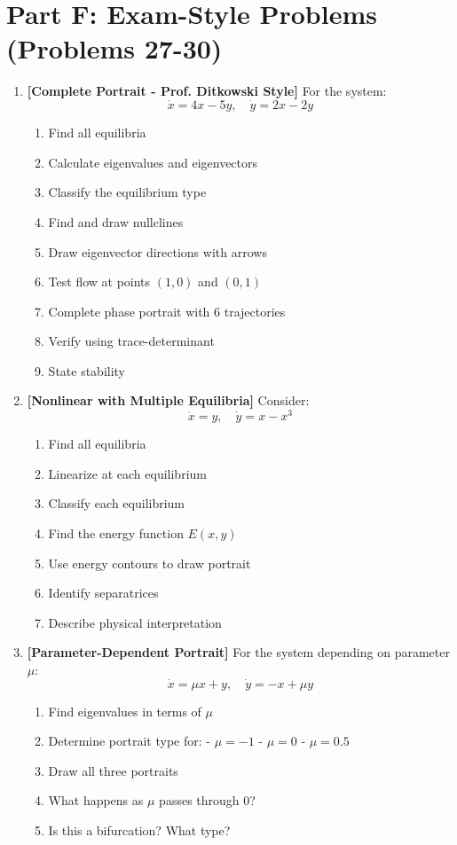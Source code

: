\documentclass[12pt]{article}
\begin{document}
\section*{Part F: Exam-Style Problems (Problems 27-30)}

\begin{enumerate}[resume]
\item \textbf{[Complete Portrait - Prof. Ditkowski Style]}
For the system:
$$\dot{x} = 4x - 5y, \quad \dot{y} = 2x - 2y$$
\begin{enumerate}[label=(\alph*)]
    \item Find all equilibria
    \item Calculate eigenvalues and eigenvectors
    \item Classify the equilibrium type
    \item Find and draw nullclines
    \item Draw eigenvector directions with arrows
    \item Test flow at points $(1,0)$ and $(0,1)$
    \item Complete phase portrait with 6 trajectories
    \item Verify using trace-determinant
    \item State stability
\end{enumerate}

\item \textbf{[Nonlinear with Multiple Equilibria]}
Consider:
$$\dot{x} = y, \quad \dot{y} = x - x^{3}$$
\begin{enumerate}[label=(\alph*)]
    \item Find all equilibria
    \item Linearize at each equilibrium
    \item Classify each equilibrium
    \item Find the energy function $E(x,y)$
    \item Use energy contours to draw portrait
    \item Identify separatrices
    \item Describe physical interpretation
\end{enumerate}

\item \textbf{[Parameter-Dependent Portrait]}
For the system depending on parameter $\mu$:
$$\dot{x} = \mu x + y, \quad \dot{y} = -x + \mu y$$
\begin{enumerate}[label=(\alph*)]
    \item Find eigenvalues in terms of $\mu$
    \item Determine portrait type for:
        - $\mu = -1$
        - $\mu = 0$
        - $\mu = 0.5$
    \item Draw all three portraits
    \item What happens as $\mu$ passes through 0?
    \item Is this a bifurcation? What type?
\end{enumerate}


\end{enumerate}
\end{document}
